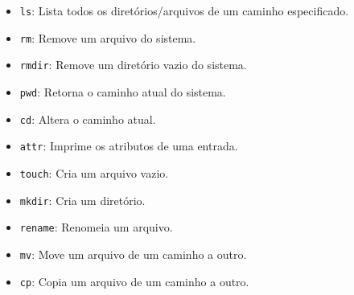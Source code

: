 \documentclass[
    12pt,				%
    oneside,   	        %
    a4paper,			%
    english,			%
    french,				%
    spanish,			%
    brazil,				%
    ]{pacotes/abntex2}
\begin{document}
\begin{itemize}
\begin{itemize}
            \item \texttt{ls}: Lista todos os diretórios/arquivos de um caminho especificado.
            \item \texttt{rm}: Remove um arquivo do sistema.
            \item \texttt{rmdir}: Remove um diretório vazio do sistema.
            \item \texttt{pwd}: Retorna o caminho atual do sistema.
            \item \texttt{cd}: Altera o caminho atual.
            \item \texttt{attr}: Imprime os atributos de uma entrada.
            \item \texttt{touch}: Cria um arquivo vazio.
            \item \texttt{mkdir}: Cria um diretório.
            \item \texttt{rename}: Renomeia um arquivo.
            \item \texttt{mv}: Move um arquivo de um caminho a outro.
            \item \texttt{cp}: Copia um arquivo de um caminho a outro.
        \end{itemize}
\end{itemize}
\end{document}
